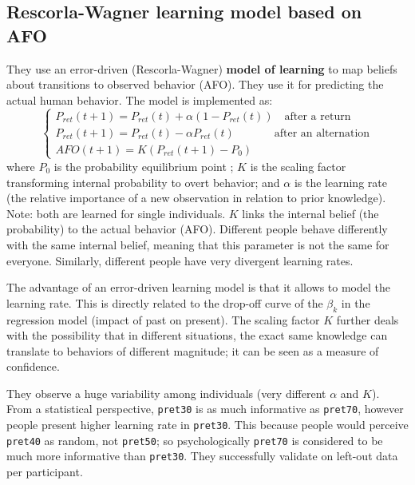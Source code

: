\subsection{Rescorla-Wagner learning model based on AFO}
They use an error-driven (Rescorla-Wagner) \textbf{model of learning} to map beliefs about transitions to observed behavior (AFO). They use it for predicting the actual human behavior. The model is implemented as:
\[
\begin{cases}
    P_{ret}(t+1) = P_{ret}(t) + \alpha(1-P_{ret}(t)) \quad \text{after a return}\\
    P_{ret}(t+1) = P_{ret}(t) - \alpha P_{ret}(t) \quad \quad \quad \;\; \text{after an alternation}\\
    AFO(t+1) = K(P_{ret}(t+1)-P_0)
\end{cases}
\]
where $P_0$ is the probability equilibrium point \notet; $K$ is the scaling factor transforming internal probability to overt behavior; and $\alpha$ is the learning rate (the relative importance of a new observation in relation to prior knowledge). Note: both are learned for single individuals. $K$ links the internal belief (the probability) to the actual behavior (AFO). Different people behave differently with the same internal belief, meaning that this parameter is not the same for everyone. Similarly, different people have very divergent learning rates.

The advantage of an error-driven learning model is that it allows to model the learning rate. This is directly related to the drop-off curve of the $\beta_k$ in the regression model (impact of past on present). The scaling factor $K$ further deals with the possibility that in different situations, the exact same knowledge can translate to behaviors of different magnitude; it can be seen as a measure of confidence.


They observe a huge variability among individuals (very different $\alpha$ and $K$). From a statistical perspective, \texttt{pret30} is as much informative as \texttt{pret70}, however people present higher learning rate in \texttt{pret30}. This because people would perceive \texttt{pret40} as random, not \texttt{pret50}; so psychologically \texttt{pret70} is considered to be much more informative than \texttt{pret30}.
They successfully validate on left-out data per participant.

